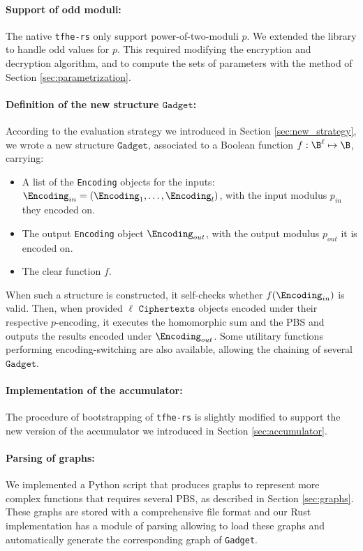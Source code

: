 \paragraph{Support of odd moduli: } The native \texttt{tfhe-rs} only support power-of-two-moduli $p$. We extended the library to handle odd values for $p$. This required modifying the encryption and decryption algorithm, and to compute the sets of parameters with the method of Section \ref{sec:parametrization}.


\paragraph{Definition of the new structure $\texttt{Gadget}$: } According to the evaluation strategy we introduced in Section \ref{sec:new_strategy}, we wrote a new structure $\texttt{Gadget}$, associated to a Boolean function $f: \B^\ell \mapsto \B$, carrying:
\begin{itemize}
    \item A list of the \texttt{Encoding} objects for the inputs: $\Encoding_{in} = (\Encoding_1, \dots, \Encoding_l)$, with the input modulus $p_{in}$ they encoded on.
    \item The output \texttt{Encoding} object $\Encoding_{out}$, with the output modulus $p_{out}$ it is encoded on.
    \item The clear function $f$.
\end{itemize}
When such a structure is constructed, it self-checks whether $f(\Encoding_{in})$ is valid. Then, when provided $\ell$ $\texttt{Ciphertexts}$ objects encoded under their respective $p$-encoding, it executes the homomorphic sum and the PBS and outputs the results encoded under $\Encoding_{out}$. Some utilitary functions performing encoding-switching are also available, allowing the chaining of several $\texttt{Gadget}$.


\paragraph{Implementation of the accumulator: } The procedure of bootstrapping of \texttt{tfhe-rs} is slightly modified to support the new version of the accumulator we introduced in Section \ref{sec:accumulator}.

\paragraph{Parsing of graphs: } We implemented a Python script that produces graphs to represent more complex functions that requires several PBS, as described in Section \ref{sec:graphs}. These graphs are stored with a comprehensive file format and our Rust implementation has a module of parsing allowing to load these graphs and automatically generate the corresponding graph of \texttt{Gadget}.



